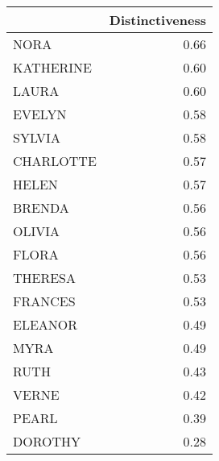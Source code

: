 \begin{table}

\caption{\label{tab:Cp}}
\centering
\begin{tabular}[t]{lr}
\toprule
  & Distinctiveness\\
\midrule
NORA & 0.66\\
KATHERINE & 0.60\\
LAURA & 0.60\\
EVELYN & 0.58\\
SYLVIA & 0.58\\
CHARLOTTE & 0.57\\
HELEN & 0.57\\
BRENDA & 0.56\\
OLIVIA & 0.56\\
FLORA & 0.56\\
THERESA & 0.53\\
FRANCES & 0.53\\
ELEANOR & 0.49\\
MYRA & 0.49\\
RUTH & 0.43\\
VERNE & 0.42\\
PEARL & 0.39\\
DOROTHY & 0.28\\
\bottomrule
\end{tabular}
\end{table}
